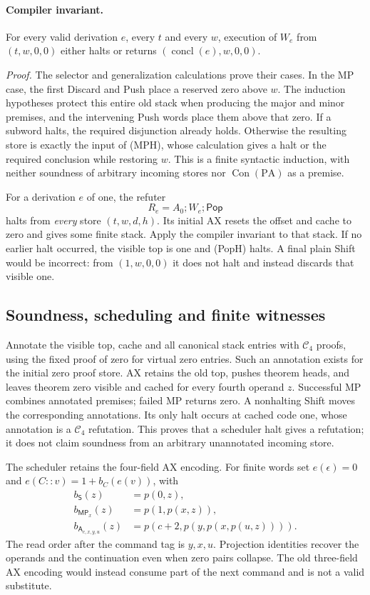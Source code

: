 \paragraph{Compiler invariant.}
For every valid derivation $e$, every $t$ and every $w$, execution of
$W_e$ from $(t,w,0,0)$ either halts or returns
$(\operatorname{concl}(e),w,0,0)$.

\emph{Proof.}
The selector and generalization calculations prove their cases.
In the MP case, the first Discard and Push place a reserved zero above
$w$.  The induction hypotheses protect this entire old stack when
producing the major and minor premises, and the intervening Push words
place them above that zero.  If a subword halts, the required disjunction
already holds.  Otherwise the resulting store is exactly the input of
(MPH), whose calculation gives a halt or the required conclusion while
restoring $w$.  This is a finite syntactic induction, with neither
soundness of arbitrary incoming stores nor $\operatorname{Con}(\mathrm{PA})$
as a premise.

For a derivation $e$ of one, the refuter
\[
              R_e=A_0;W_e;\mathsf{Pop}                         \tag{RefH}
\]
halts from \emph{every} store $(t,w,d,h)$.  Its initial AX resets the
offset and cache to zero and gives some finite stack.  Apply the compiler
invariant to that stack.  If no earlier halt occurred, the visible top
is one and (PopH) halts.  A final plain Shift would be incorrect: from
$(1,w,0,0)$ it does not halt and instead discards that visible one.

\subsection{Soundness, scheduling and finite witnesses}

Annotate the visible top, cache and all canonical stack entries with
$\mathcal C_4$ proofs, using the fixed proof of zero for virtual zero
entries.  Such an annotation exists for the initial zero proof store.
AX retains the old top, pushes theorem heads, and leaves theorem zero
visible and cached for every fourth operand $z$.  Successful MP combines
annotated premises; failed MP returns zero.  A nonhalting Shift moves
the corresponding annotations.  Its only halt occurs at cached code one,
whose annotation is a $\mathcal C_4$ refutation.  This proves that a
scheduler halt gives a refutation; it does not claim soundness from an
arbitrary unannotated incoming store.

The scheduler retains the four-field AX encoding.  For finite words set
$e(\epsilon)=0$ and $e(C::v)=1+b_C(e(v))$, with
\begin{align*}
 b_{\mathsf S}(z)&=p(0,z),\\
 b_{\mathsf{MP}_x}(z)&=p(1,p(x,z)),\\
 b_{\mathsf A_{c,x,y,u}}(z)&=p(c+2,p(y,p(x,p(u,z)))).
\end{align*}
The read order after the command tag is $y,x,u$.  Projection identities
recover the operands and the continuation even when zero pairs collapse.
The old three-field AX encoding would instead consume part of the next
command and is not a valid substitute.


